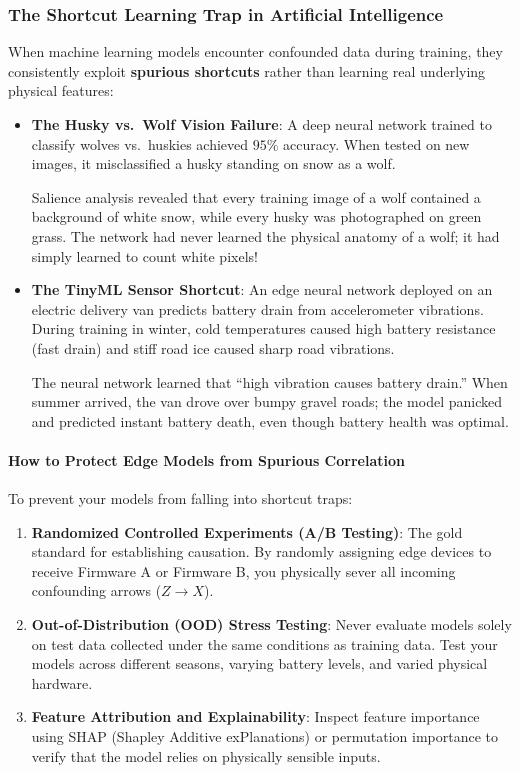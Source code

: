 \subsubsection{The Shortcut Learning Trap in Artificial Intelligence}
When machine learning models encounter confounded data during training, they consistently exploit \textbf{spurious shortcuts} rather than learning real underlying physical features:
\begin{itemize}
    \item \textbf{The Husky vs.\ Wolf Vision Failure}: A deep neural network trained to classify wolves vs.\ huskies achieved $95\%$ accuracy. When tested on new images, it misclassified a husky standing on snow as a wolf. 
    
    Salience analysis revealed that every training image of a wolf contained a background of white snow, while every husky was photographed on green grass. The network had never learned the physical anatomy of a wolf; it had simply learned to count white pixels!
    \item \textbf{The TinyML Sensor Shortcut}: An edge neural network deployed on an electric delivery van predicts battery drain from accelerometer vibrations. During training in winter, cold temperatures caused high battery resistance (fast drain) and stiff road ice caused sharp road vibrations. 
    
    The neural network learned that ``high vibration causes battery drain.'' When summer arrived, the van drove over bumpy gravel roads; the model panicked and predicted instant battery death, even though battery health was optimal.
\end{itemize}

\paragraph{How to Protect Edge Models from Spurious Correlation}
To prevent your models from falling into shortcut traps:
\begin{enumerate}
    \item \textbf{Randomized Controlled Experiments (A/B Testing)}: The gold standard for establishing causation. By randomly assigning edge devices to receive Firmware A or Firmware B, you physically sever all incoming confounding arrows ($Z \to X$).
    \item \textbf{Out-of-Distribution (OOD) Stress Testing}: Never evaluate models solely on test data collected under the same conditions as training data. Test your models across different seasons, varying battery levels, and varied physical hardware.
    \item \textbf{Feature Attribution and Explainability}: Inspect feature importance using SHAP (Shapley Additive exPlanations) or permutation importance to verify that the model relies on physically sensible inputs.
\end{enumerate}


